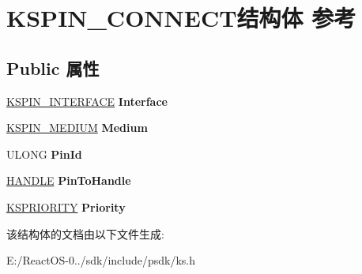 \hypertarget{struct_k_s_p_i_n___c_o_n_n_e_c_t}{}\section{K\+S\+P\+I\+N\+\_\+\+C\+O\+N\+N\+E\+C\+T结构体 参考}
\label{struct_k_s_p_i_n___c_o_n_n_e_c_t}
\subsection*{Public 属性}
\begin{DoxyCompactItemize}
\item 
\mbox{\label{struct_k_s_p_i_n___c_o_n_n_e_c_t_aca90775277dde1fe8aaa75edc9765861}} 
\hyperlink{struct_k_s_i_d_e_n_t_i_f_i_e_r}{K\+S\+P\+I\+N\+\_\+\+I\+N\+T\+E\+R\+F\+A\+CE} {\bfseries Interface}
\item 
\mbox{\label{struct_k_s_p_i_n___c_o_n_n_e_c_t_abd088c63e52c5afd0540c87e5a4628f5}} 
\hyperlink{struct_k_s_i_d_e_n_t_i_f_i_e_r}{K\+S\+P\+I\+N\+\_\+\+M\+E\+D\+I\+UM} {\bfseries Medium}
\item 
\mbox{\label{struct_k_s_p_i_n___c_o_n_n_e_c_t_a9852ce959cb95c7ced5fe0ed831835f2}} 
U\+L\+O\+NG {\bfseries Pin\+Id}
\item 
\mbox{\label{struct_k_s_p_i_n___c_o_n_n_e_c_t_ad56938812e02c27dd423d4f31d1173eb}} 
\hyperlink{interfacevoid}{H\+A\+N\+D\+LE} {\bfseries Pin\+To\+Handle}
\item 
\mbox{\label{struct_k_s_p_i_n___c_o_n_n_e_c_t_ac1719e3d12053516b9a1920d7fb1ff36}} 
\hyperlink{struct_k_s_p_r_i_o_r_i_t_y}{K\+S\+P\+R\+I\+O\+R\+I\+TY} {\bfseries Priority}
\end{DoxyCompactItemize}


该结构体的文档由以下文件生成\+:\begin{DoxyCompactItemize}
\item 
E\+:/\+React\+O\+S-\/0../sdk/include/psdk/ks.\+h\end{DoxyCompactItemize}
